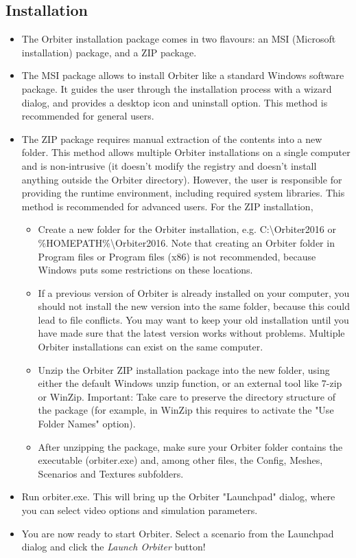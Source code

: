 \documentclass[Orbiter User Manual.tex]{subfiles}
\begin{document}
\subsection{Installation}
\begin{itemize}
\item The Orbiter installation package comes in two flavours: an MSI (Microsoft installation) package, and a ZIP package.
\item The MSI package allows to install Orbiter like a standard Windows software package. It guides the user through the installation process with a wizard dialog, and provides a desktop icon and uninstall option. This method is recommended for general users.
\item The ZIP package requires manual extraction of the contents into a new folder. This method allows multiple Orbiter installations on a single computer and is non-intrusive (it doesn't modify the registry and doesn't install anything outside the Orbiter directory). However, the user is responsible for providing the runtime environment, including required system libraries. This method is recommended for advanced users. For the ZIP installation,

\begin{itemize}
\item Create a new folder for the Orbiter installation, e.g. C:\textbackslash Orbiter2016 or \%HOMEPATH\%\textbackslash Orbiter2016. Note that creating an Orbiter folder in Program files or Program files (x86) is not recommended, because Windows puts some restrictions on these locations.
\item If a previous version of Orbiter is already installed on your computer, you should not install the new version into the same folder, because this could lead to file conflicts. You may want to keep your old installation until you have made sure that the latest version works without problems. Multiple Orbiter installations can exist on the same computer.
\item Unzip the Orbiter ZIP installation package into the new folder, using either the default Windows unzip function, or an external tool like 7-zip or WinZip. Important: Take care to preserve the directory structure of the package (for example, in WinZip this requires to activate the "Use Folder Names" option).
\item After unzipping the package, make sure your Orbiter folder contains the executable (orbiter.exe) and, among other files, the Config, Meshes, Scenarios and Textures subfolders.
\end{itemize}

\item Run orbiter.exe. This will bring up the Orbiter "Launchpad" dialog, where you can select video options and simulation parameters.
\item You are now ready to start Orbiter. Select a scenario from the Launchpad dialog and click the \textit{Launch Orbiter} button!
\end{itemize}
\end{document}
